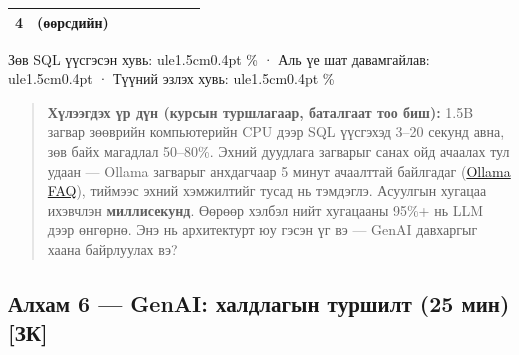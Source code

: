 \begin{longtable}[]{@{}llllllll@{}}
\begin{minipage}[t]{0.10\columnwidth}\raggedright
4\strut
\end{minipage} & \begin{minipage}[t]{0.10\columnwidth}\raggedright
(өөрсдийн)\strut
\end{minipage} & \begin{minipage}[t]{0.10\columnwidth}\raggedright
\strut
\end{minipage} & \begin{minipage}[t]{0.10\columnwidth}\raggedright
\strut
\end{minipage} & \begin{minipage}[t]{0.10\columnwidth}\raggedright
\strut
\end{minipage} & \begin{minipage}[t]{0.10\columnwidth}\raggedright
\strut
\end{minipage} & \begin{minipage}[t]{0.10\columnwidth}\raggedright
\strut
\end{minipage} & \begin{minipage}[t]{0.10\columnwidth}\raggedright
\strut
\end{minipage}\tabularnewline
\bottomrule
\end{longtable}\endgroup

Зөв SQL үүсгэсэн хувь: ule{1.5cm}{0.4pt} \% · Аль үе шат давамгайлав: ule{1.5cm}{0.4pt} · Түүний эзлэх хувь: ule{1.5cm}{0.4pt} \%

\begin{quote}
\textbf{Хүлээгдэх үр дүн (курсын туршлагаар, баталгаат тоо биш):} 1.5B загвар зөөврийн компьютерийн CPU дээр SQL үүсгэхэд 3--20 секунд авна, зөв байх магадлал 50--80\%. Эхний дуудлага загварыг санах ойд ачаалах тул удаан --- Ollama загварыг анхдагчаар 5 минут ачаалттай байлгадаг (\href{https://docs.ollama.com/faq}{Ollama FAQ}), тиймээс эхний хэмжилтийг тусад нь тэмдэглэ. Асуулгын хугацаа ихэвчлэн \textbf{миллисекунд}. Өөрөөр хэлбэл нийт хугацааны 95\%+ нь LLM дээр өнгөрнө. Энэ нь архитектурт юу гэсэн үг вэ --- GenAI давхаргыг хаана байрлуулах вэ?
\end{quote}

\hypertarget{ux430ux43bux445ux430ux43c-6-genai-ux445ux430ux43bux434ux43bux430ux433ux44bux43d-ux442ux443ux440ux448ux438ux43bux442-25-ux43cux438ux43d-ux437ux43a}{%
\subsection{Алхам 6 --- GenAI: халдлагын туршилт (25 мин) {[}ЗК{]}}\label{ux430ux43bux445ux430ux43c-6-genai-ux445ux430ux43bux434ux43bux430ux433ux44bux43d-ux442ux443ux440ux448ux438ux43bux442-25-ux43cux438ux43d-ux437ux43a}}

